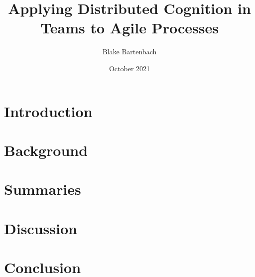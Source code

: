 \documentclass[acmsmall,screen]{acmart}
\begin{document}
\title{Applying Distributed Cognition in Teams to Agile Processes}

\author{Blake Bartenbach}
\date{October 2021}

\acmBooktitle{}

\begin{abstract}
  
\end{abstract}

\maketitle

\section{Introduction}


\section{Background}


\section{Summaries}
\subsection{}


\subsection{}


\subsection{}


\section{Discussion}


\section{Conclusion}




\end{document}
